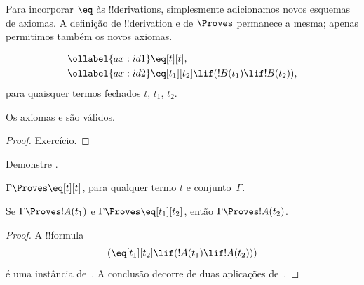 \documentclass[../../../include/open-logic-section]{subfiles}
\begin{document}


Para incorporar $\eq$ às !!{derivation}s, simplesmente adicionamos novos
esquemas de axiomas. A definição de !!{derivation} e de $\Proves$
permanece a mesma; apenas permitimos também os novos axiomas.

\begin{defn}
\begin{align}
\ollabel{ax:id1} & \eq[t][t], \\
\ollabel{ax:id2} & \eq[t_1][t_2] \lif (!B(t_1) \lif
  !B(t_2)),
\end{align}
para quaisquer termos fechados $t$, $t_1$, $t_2$.
\end{defn}

\begin{prop}
  Os axiomas  e  são válidos.
\end{prop}

\begin{proof}
  Exercício.
\end{proof}

\begin{prob}
Demonstre .
\end{prob}

\begin{prop}
 $\Gamma \Proves \eq[t][t]$, para qualquer termo $t$ e conjunto~$\Gamma$.
\end{prop}

\begin{prop}
  Se $\Gamma \Proves !A(t_1)$ e $\Gamma \Proves
  \eq[t_1][t_2]$, então $\Gamma \Proves !A(t_2)$.
\end{prop}

\begin{proof}
A !!{formula}
\[
(\eq[t_1][t_2] \lif (!A(t_1) \lif !A(t_2)))
\]
é uma instância de~. A conclusão decorre de duas aplicações
de~\MP.
\end{proof}
\end{document}
